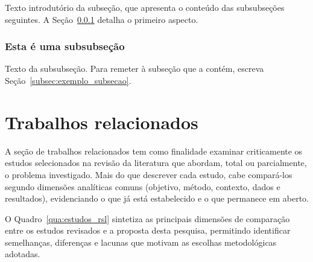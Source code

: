 Texto introdutório da subseção, que apresenta o conteúdo das subsubseções seguintes. A Seção~\ref{subsubsec:exemplo_subsubsecao} detalha o primeiro aspecto.

\subsubsection{Esta é uma subsubseção}
\label{subsubsec:exemplo_subsubsecao}

Texto da subsubseção. Para remeter à subseção que a contém, escreva Seção~\ref{subsec:exemplo_subsecao}.

\section{Trabalhos relacionados}
\label{sec:trabalhos_relacionados}
A seção de trabalhos relacionados tem como finalidade examinar criticamente os estudos selecionados na revisão da literatura que abordam, total ou parcialmente, o problema investigado. Mais do que descrever cada estudo, cabe compará-los segundo dimensões analíticas comuns (objetivo, método, contexto, dados e resultados), evidenciando o que já está estabelecido e o que permanece em aberto.

O Quadro~\ref{qua:estudos_rsl} sintetiza as principais dimensões de comparação entre os estudos revisados e a proposta desta pesquisa, permitindo identificar semelhanças, diferenças e lacunas que motivam as escolhas metodológicas adotadas.


